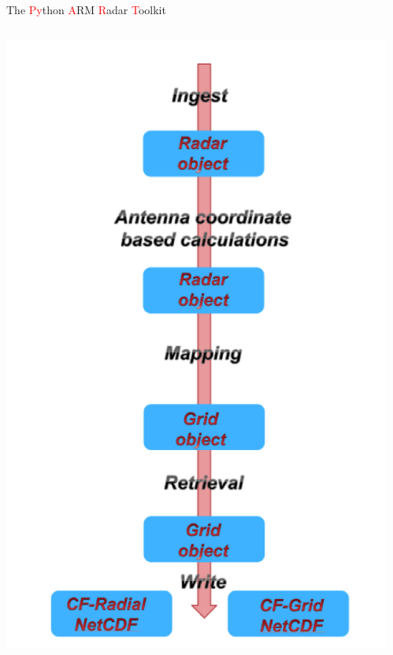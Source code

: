 \documentclass[final]{beamer}
\begin{document}
\begin{frame}{}
\begin{columns}[t]
\begin{column}{.3\linewidth}
\begin{block}{The \textcolor{red}{Py}thon \textcolor{red}{A}RM \textcolor{red}{R}adar \textcolor{red}{T}oolkit}
\begin{columns}[t]
\begin{column}{.4\linewidth}
                       \includegraphics[width=0.9\linewidth]{figures/pyart-flow}\\[1ex]   
                   \end{column}
               \end{columns}
         \end{block}
         

     

    \end{column}
      \begin{column}{.3\linewidth}
  \vfill
 

\end{column}
\end{columns}
\end{frame}
\end{document}
